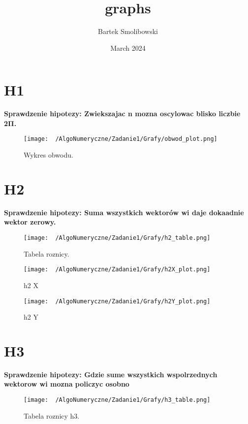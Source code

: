 \documentclass{article}
\title{graphs}
\author{Bartek Smolibowski}
\date{March 2024}
\begin{document}
\maketitle

\clearpage
\section{H1}

\textbf{Sprawdzenie hipotezy:  Zwiekszajac n mozna oscylowac blisko liczbie 2Π.}

\begin{figure}[htbp]
    \centering
    \texttt{[image: ~/AlgoNumeryczne/Zadanie1/Grafy/obwod\_plot.png]}
    \caption{Wykres obwodu.}
    \label{fig:h1}
\end{figure}

\clearpage
\section{H2}

\textbf{Sprawdzenie hipotezy:  Suma wszystkich wektorów wi daje dokaadnie wektor zerowy.}

\begin{figure}[t]
    \centering
    \texttt{[image: ~/AlgoNumeryczne/Zadanie1/Grafy/h2\_table.png]}
    \caption{Tabela roznicy.}
    \label{fig:h2}
\end{figure}

\begin{figure}[t]
    \centering
    \texttt{[image: ~/AlgoNumeryczne/Zadanie1/Grafy/h2X\_plot.png]}
    \caption{h2 X}
    \label{fig:h2}
\end{figure}

\begin{figure}[t]
    \centering
    \texttt{[image: ~/AlgoNumeryczne/Zadanie1/Grafy/h2Y\_plot.png]}
    \caption{h2 Y}
    \label{fig:h2}
\end{figure}


\clearpage
\section{H3}

\textbf{Sprawdzenie hipotezy: Gdzie sume wszystkich wspolrzednych wektorow wi mozna policzyc osobno }

\begin{figure}[htbp]
    \centering
    \texttt{[image: ~/AlgoNumeryczne/Zadanie1/Grafy/h3\_table.png]}
    \caption{Tabela roznicy h3.}
    \label{fig:h3}
\end{figure}
\end{document}
